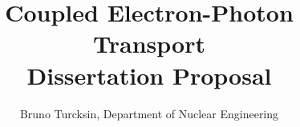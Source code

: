 \documentclass{article}
\renewcommand{\(}{\left(}
\renewcommand{\)}{\right)}
\renewcommand{\[}{\left[}
\renewcommand{\]}{\right]}
\begin{document}
\title{Coupled Electron-Photon Transport\\
\small{Dissertation Proposal}}
\author{Bruno Turcksin, Department of Nuclear Engineering} 
\date{}
\maketitle









\nocite{*}
\end{document}
